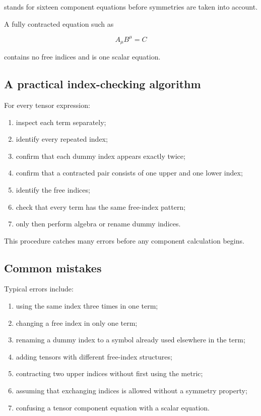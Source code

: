 stands for sixteen component equations before symmetries are taken into account.

A fully contracted equation such as

\[
A_{\mu}B^{\mu}=C
\]

contains no free indices and is one scalar equation.

\subsection{A practical index-checking algorithm}

For every tensor expression:

\begin{enumerate}
    \item inspect each term separately;
    \item identify every repeated index;
    \item confirm that each dummy index appears exactly twice;
    \item confirm that a contracted pair consists of one upper and one lower index;
    \item identify the free indices;
    \item check that every term has the same free-index pattern;
    \item only then perform algebra or rename dummy indices.
\end{enumerate}

This procedure catches many errors before any component calculation begins.

\subsection{Common mistakes}

Typical errors include:

\begin{enumerate}
    \item using the same index three times in one term;
    \item changing a free index in only one term;
    \item renaming a dummy index to a symbol already used elsewhere in the term;
    \item adding tensors with different free-index structures;
    \item contracting two upper indices without first using the metric;
    \item assuming that exchanging indices is allowed without a symmetry property;
    \item confusing a tensor component equation with a scalar equation.
\end{enumerate}

